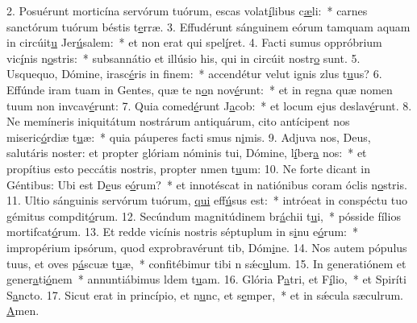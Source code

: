 2. Posuérunt morticína servórum tuórum, escas volat\uline{í}libus c\uline{æ}li:~* carnes sanctórum tuórum béstis t\uline{e}rræ.
3. Effudérunt sánguinem eórum tamquam aquam in circúit\uline{u} Jer\uline{ú}salem:~* et non erat qui spel\uline{í}ret.
4. Facti sumus oppróbrium vic\uline{í}nis n\uline{o}stris:~* subsannátio et illúsio his, qui in circúit nostr\uline{o} sunt.
5. Usquequo, Dómine, irasc\uline{é}ris in f\uline{i}nem:~* accendétur velut ignis zlus t\uline{u}us?
6. Effúnde iram tuam in Gentes, quæ te n\uline{o}n nov\uline{é}runt:~* et in regna quæ nomen tuum non invcav\uline{é}runt:
7. Quia comed\uline{é}runt J\uline{a}cob:~* et locum ejus deslav\uline{é}runt.
8. Ne memíneris iniquitátum nostrárum antiquárum, cito antícipent nos miseric\uline{ó}rdiæ t\uline{u}æ:~* quia páuperes facti smus n\uline{i}mis.
9. Adjuva nos, Deus, salutáris noster: et propter glóriam nóminis tui, Dómine, l\uline{í}ber\uline{a} nos:~* et propítius esto peccátis nostris, propter nmen t\uline{u}um:
10. Ne forte dicant in Géntibus: Ubi est D\uline{e}us e\uline{ó}rum?~* et innotéscat in natiónibus coram óclis n\uline{o}stris.
11. Ultio sánguinis servórum tuórum, \uline{qui} eff\uline{ú}sus est:~* intróeat in conspéctu tuo gémitus compdit\uline{ó}rum.
12. Secúndum magnitúdinem br\uline{á}chii t\uline{u}i,~* pósside fílios mortifcat\uline{ó}rum.
13. Et redde vicínis nostris séptuplum in s\uline{i}nu e\uline{ó}rum:~* impropérium ipsórum, quod exprobravérunt tib, Dóm\uline{i}ne.
14. Nos autem pópulus tuus, et oves p\uline{á}scuæ t\uline{u}æ,~* confitébimur tibi n sǽc\uline{u}lum.
15. In generatiónem et gener\uline{a}ti\uline{ó}nem~* annuntiábimus ldem t\uline{u}am.
16. Glória P\uline{a}tri, et F\uline{í}lio,~* et Spiríti S\uline{a}ncto.
17. Sicut erat in princípio, et n\uline{u}nc, et s\uline{e}mper,~* et in sǽcula sæculrum. \uline{A}men.

